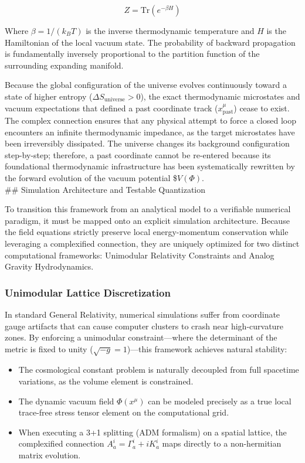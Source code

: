 \[Z = \text{Tr}(e^{-\beta H})\]

Where \(\beta = 1/(k_B T)\) is the inverse thermodynamic temperature and
\(H\) is the Hamiltonian of the local vacuum state. The probability of
backward propagation is fundamentally inversely proportional to the
partition function of the surrounding expanding manifold.

Because the global configuration of the universe evolves continuously
toward a state of higher entropy (\(\Delta S_{\text{universe}} > 0\)),
the exact thermodynamic microstates and vacuum expectations that defined
a past coordinate track (\(x^\mu_{\text{past}}\)) cease to exist. The
complex connection ensures that any physical attempt to force a closed
loop encounters an infinite thermodynamic impedance, as the target
microstates have been irreversibly dissipated. The universe changes its
background configuration step-by-step; therefore, a past coordinate
cannot be re-entered because its foundational thermodynamic
infrastructure has been systematically rewritten by the forward
evolution of the vacuum potential \$\(V(\Phi)\).\\
\#\# Simulation Architecture and Testable Quantization

To transition this framework from an analytical model to a verifiable
numerical paradigm, it must be mapped onto an explicit simulation
architecture. Because the field equations strictly preserve local
energy-momentum conservation while leveraging a complexified connection,
they are uniquely optimized for two distinct computational frameworks:
Unimodular Relativity Constraints and Analog Gravity Hydrodynamics.

\subsubsection{Unimodular Lattice
Discretization}\label{unimodular-lattice-discretization}

In standard General Relativity, numerical simulations suffer from
coordinate gauge artifacts that can cause computer clusters to crash
near high-curvature zones. By enforcing a unimodular constraint---where
the determinant of the metric is fixed to unity
(\(\sqrt{-g} = 1\))---this framework achieves natural stability:

\begin{itemize}
\tightlist
\item
  The cosmological constant problem is naturally decoupled from full
  spacetime variations, as the volume element is constrained.
\item
  The dynamic vacuum field \(\Phi(x^\mu)\) can be modeled precisely as a
  true local trace-free stress tensor element on the computational grid.
\item
  When executing a 3+1 splitting (ADM formalism) on a spatial lattice,
  the complexified connection \(A_a^i = \Gamma_a^i + i K_a^i\) maps
  directly to a non-hermitian matrix evolution.
\end{itemize}


